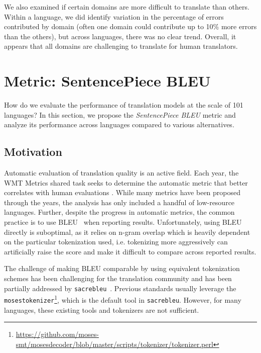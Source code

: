 We also examined if certain domains are more difficult to translate than others. Within a language, we did identify variation in the percentage of errors contributed by domain (often one domain could contribute up to 10\% more errors than the others), but across languages, there was no clear trend. Overall, it appears that all domains are challenging to translate for human translators.

\section{Metric: SentencePiece BLEU} 
\label{sec:metric}

How do we evaluate the performance of translation models at the scale of 101 languages? In this section, we propose the \textit{SentencePiece BLEU} metric and analyze its performance across languages compared to various alternatives. 

\subsection{Motivation}

Automatic evaluation of translation quality is an active field. Each year, the WMT Metrics shared task seeks to determine the automatic metric that better correlates with human evaluations \cite{mathur-EtAl:2020:WMT}. While many metrics have been proposed through the years, the analysis has only included a handful of low-resource languages. Further, despite the progress in automatic metrics, the common practice is to use BLEU~\citep{bleu} when reporting results. Unfortunately, using BLEU directly is suboptimal, as it relies on n-gram overlap which is heavily dependent on the particular tokenization used, i.e. tokenizing more aggressively can artificially raise the score and make it difficult to compare across reported results. 

The challenge of making BLEU comparable by using equivalent tokenization schemes has been challenging for the translation community and has been partially addressed by  \texttt{sacrebleu}~\cite{post2018call}.
Previous standards usually leverage the \texttt{mosestokenizer}\footnote{\url{https://github.com/moses-smt/mosesdecoder/blob/master/scripts/tokenizer/tokenizer.perl}}, which is the default tool in \texttt{sacrebleu}. 
However, for many languages, these existing tools and tokenizers are not sufficient. 

